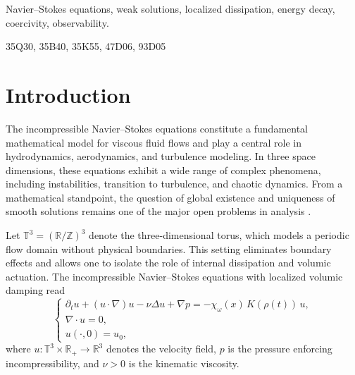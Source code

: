 \documentclass[preprint,12pt]{elsarticle}
\begin{document}
\begin{frontmatter}


\begin{keyword}
Navier--Stokes equations, weak solutions, localized dissipation,
energy decay, coercivity, observability.


\MSC[]35Q30, 35B40, 35K55, 47D06, 93D05
\end{keyword}

\end{frontmatter}

\section{Introduction}

The incompressible Navier--Stokes equations constitute a fundamental mathematical
model for viscous fluid flows and play a central role in hydrodynamics,
aerodynamics, and turbulence modeling.
In three space dimensions, these equations exhibit a wide range of complex
phenomena, including instabilities, transition to turbulence, and chaotic
dynamics.
From a mathematical standpoint, the question of global existence and uniqueness
of smooth solutions remains one of the major open problems in analysis
\cite{Fefferman2006,TemamNS2001,FoiasTemamTurbulence2001}.

\medskip

Let $\mathbb{T}^3=(\mathbb{R}/\mathbb{Z})^3$ denote the three-dimensional torus,
which models a periodic flow domain without physical boundaries.
This setting eliminates boundary effects and allows one to isolate the role of
internal dissipation and volumic actuation. The incompressible Navier–Stokes equations with localized volumic damping read
\begin{equation}
\label{eq:NS_controlled}
\begin{cases}
\partial_t u + (u\cdot\nabla)u - \nu \Delta u + \nabla p
= - \chi_\omega(x)\, K(\rho(t))\, u,\\[1mm]
\nabla\cdot u = 0,\\
u(\cdot,0)=u_0,
\end{cases}
\end{equation}
where $u:\mathbb{T}^3\times\mathbb{R}_+\to\mathbb{R}^3$ denotes the velocity field,
$p$ is the pressure enforcing incompressibility, and $\nu>0$ is the kinematic
viscosity.
\end{document}
